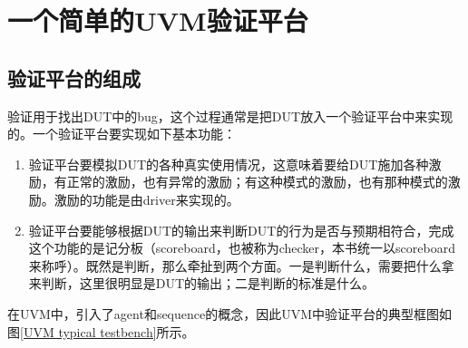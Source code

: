 \chapter{一个简单的UVM验证平台}\label{ch2}

\section{验证平台的组成}\label{sec2-1}

验证用于找出DUT中的bug，这个过程通常是把DUT放入一个验证平台中来实现的。一个验证平台要实现如下基本功能：

\begin{enumerate}
	\item 验证平台要模拟DUT的各种真实使用情况，这意味着要给DUT施加各种激励，有正常的激励，也有异常的激励；有这种模式的激励，也有那种模式的激励。激励的功能是由driver来实现的。
	\item 验证平台要能够根据DUT的输出来判断DUT的行为是否与预期相符合，完成这个功能的是记分板（scoreboard，也被称为checker，本书统一以scoreboard来称呼）。既然是判断，那么牵扯到两个方面。一是判断什么，需要把什么拿来判断，这里很明显是DUT的输出；二是判断的标准是什么。
\end{enumerate}

在UVM中，引入了agent和sequence的概念，因此UVM中验证平台的典型框图如图\ref{UVM typical testbench}所示。

